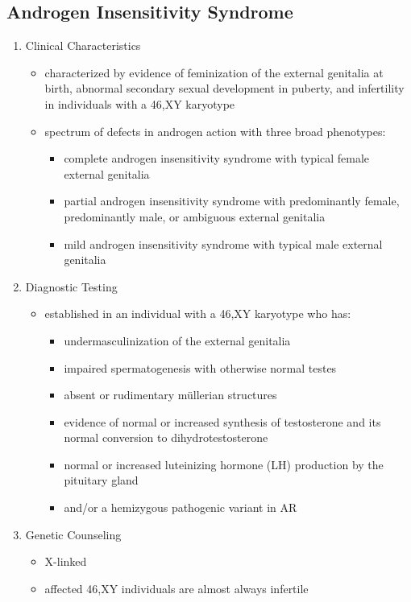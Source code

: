\documentclass[12pt]{scrartcl}
\begin{document}
\subsection{Androgen Insensitivity Syndrome}
\label{sec:orgdb47115}
\begin{enumerate}
\item Clinical Characteristics
\label{sec:orgd7921fd}
\begin{itemize}
\item characterized by evidence of feminization of the external genitalia
at birth, abnormal secondary sexual development in puberty, and
infertility in individuals with a 46,XY karyotype
\item spectrum of defects in androgen action with three broad phenotypes:
\begin{itemize}
\item complete androgen insensitivity syndrome with typical
female external genitalia
\item partial androgen insensitivity syndrome with predominantly
female, predominantly male, or ambiguous external genitalia
\item mild androgen insensitivity syndrome with typical male external
genitalia
\end{itemize}
\end{itemize}
\item Diagnostic Testing
\label{sec:orgac3cb09}
\begin{itemize}
\item established in an individual with a 46,XY karyotype who has:
\begin{itemize}
\item undermasculinization of the external genitalia
\item impaired spermatogenesis with otherwise normal testes
\item absent or rudimentary müllerian structures
\item evidence of normal or increased synthesis of testosterone and its
normal conversion to dihydrotestosterone
\item normal or increased luteinizing hormone (LH) production by the
pituitary gland
\item and/or a hemizygous pathogenic variant in AR
\end{itemize}
\end{itemize}
\item Genetic Counseling
\label{sec:orge82e7d7}
\begin{itemize}
\item X-linked
\item affected 46,XY individuals are almost always infertile
\end{itemize}
\end{enumerate}
\end{document}

